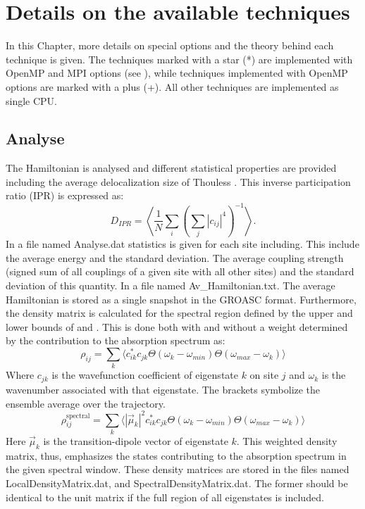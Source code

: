 \chapter{\label{chap:techniques}Details on the available techniques}
In this Chapter, more details on special options and the theory behind each technique is given. The techniques marked with a star (*) are implemented with OpenMP and MPI options (see \cite{Sardjan_2020}), while techniques implemented with OpenMP options are marked with a plus (+). All other techniques are implemented as single CPU. 
\section{Analyse}
The Hamiltonian is analysed and different statistical properties are provided including the average delocalization size of Thouless \cite{Thouless.1974.PR.13.93}. This inverse participation ratio (IPR) is expressed as:
\begin{equation}
	D_{IPR}=\left\langle\frac{1}{N}\sum_i\left(\sum_j |c_{ij}|^{4}\right)^{-1}\right \rangle.
\end{equation}
In a file named Analyse.dat statistics is given for each site including. This include the average energy and the standard deviation. The average coupling strength (signed sum of all couplings of a given site with all other sites) and the standard deviation of this quantity.
In a file named Av\_Hamiltonian.txt. The average Hamiltonian is stored as a single snapshot in the GROASC format.
Furthermore, the density matrix is calculated for the spectral region defined by the upper and lower bounds of  and . This is done both with and without a weight determined by the contribution to the absorption spectrum as:
\begin{equation}
\rho_{ij}=\sum_k \Big\langle c_{ik}^* c_{jk}  \Theta(\omega_{k}-\omega_{min})\Theta(\omega_{max}-\omega_k)\Big\rangle
\end{equation}
Where $c_{jk}$ is the wavefunction coefficient of eigenstate $k$ on site $j$ and $\omega_k$ is the wavenumber associated with that eigenstate. The brackets symbolize the ensemble average over the trajectory.
\begin{equation}
\rho^{\textrm{spectral}}_{ij}=\sum_k \Big\langle |\vec{\mu}_k|^2 c_{ik}^* c_{jk}  \Theta(\omega_{k}-\omega_{min})\Theta(\omega_{max}-\omega_k)\Big\rangle
\end{equation}
Here $\vec{\mu}_k$ is the transition-dipole vector of eigenstate $k$. This weighted density matrix, thus, emphasizes the states contributing to the absorption spectrum in the given spectral window. These density matrices are stored in the files named LocalDensityMatrix.dat, and SpectralDensityMatrix.dat. The former should be identical to the unit matrix if the full region of all eigenstates is included.
